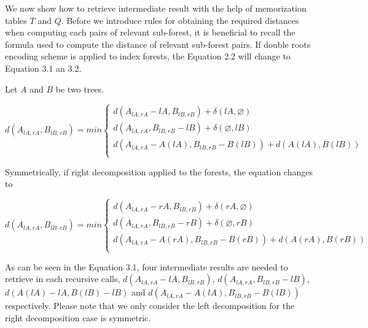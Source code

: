We now show how to retrieve intermediate result with the help of memorization tables $T$ and $Q$. Before we introduce rules for obtaining the required distances when computing each pairs of relevant sub-forest, it is beneficial to recall the formula used to compute the distance of relevant sub-forest pairs. If double roots encoding scheme is applied to index forests, the Equation 2.2 will change to Equation 3.1 an 3.2.

Let $A$ and $B$ be two trees.

\begin{equation}
d(A_{lA, rA}, B_{lB, rB}) = min \begin{cases}
d(A_{lA, rA} - lA, B_{lB, rB}) + \delta(lA, \varnothing)\\
d(A_{lA, rA}, B_{lB, rB} - lB) + \delta(\varnothing, lB)\\
d(A_{lA, rA} - A(lA), B_{lB, rB} - B(lB)) + d(A(lA), B(lB))\\
 \end{cases}
\end{equation}

Symmetrically, if right decomposition applied to the forests, the equation changes to 

\begin{equation}
d(A_{lA, rA}, B_{lB, rB}) = min \begin{cases}
d(A_{lA, rA} - rA, B_{lB, rB}) + \delta(rA, \varnothing)\\
d(A_{lA, rA}, B_{lB, rB} - rB) + \delta(\varnothing, rB)\\
d(A_{lA, rA} - A(rA), B_{lB, rB} - B(rB)) + d(A(rA), B(rB))\\
\end{cases}
\end{equation}
 
As can be seen in the Equation 3.1, four intermediate results are needed to retrieve in each recursive calls, $d(A_{lA, rA} - lA, B_{lB, rB})$, $d(A_{lA, rA}, B_{lB, rB} - lB)$, $d(A(lA) - lA, B(lB) - lB)$ and $d(A_{lA, rA} - A(lA), B_{lB, rB} - B(lB))$ respectively. Please note that we only consider the left decomposition for the right decomposition case is symmetric.

